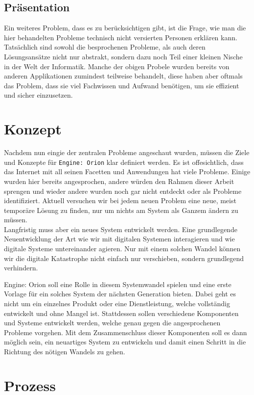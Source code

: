 \documentclass[11pt]{article}
\begin{document}
\subsection{Präsentation}
\label{sec:orga58f675}
Ein weiteres Problem, dass es zu berücksichtigen gibt, ist die Frage,
wie man die hier behandelten Probleme technisch nicht versierten
Personen erklären kann. Tatsächlich sind sowohl die besprochenen
Probleme, als auch deren Lösungsansätze nicht nur abstrakt, sondern
dazu noch Teil einer kleinen Nische in der Welt der Informatik.
Manche der obigen Probele wurden bereits von anderen Applikationen
zumindest teilweise behandelt, diese haben aber oftmals das Problem,
dass sie viel Fachwissen und Aufwand benötigen, um sie effizient und
sicher einzusetzen.
\section{Konzept}
\label{sec:org1cc2468}
Nachdem nun eingie der zentralen Probleme angeschaut wurden, müssen
die Ziele und Konzepte für \texttt{Engine: Orion} klar definiert werden. Es ist
offesichtlich, dass das Internet mit all seinen Facetten und
Anwendungen hat viele Probleme. Einige wurden hier bereits
angesprochen, andere würden den Rahmen dieser Arbeit sprengen und
wieder andere wurden noch gar nicht entdeckt oder als Probleme
identifiziert. Aktuell versuchen wir bei jedem neuen Problem eine
neue, meist temporäre Lösung zu finden, nur um nichts am System als
Ganzem ändern zu müssen.\\

\noindent Langfristig muss aber ein neues System entwickelt werden.
Eine grundlegende Neuentwicklung der Art wie wir mit digitalen
Systemen interagieren und wie digitale Systeme untereinander agieren.
Nur mit einem solchen Wandel können wir die digitale Katastrophe nicht
einfach nur verschieben, sondern grundlegend verhindern.

\noindent Engine: Orion soll eine Rolle in diesem Systemwandel spielen
und eine erste Vorlage für ein solches System der nächsten Generation
bieten. Dabei geht es nicht um ein einzelnes Produkt oder eine
Dienstleistung, welche vollständig entwickelt und ohne Mangel ist.
Stattdessen sollen verschiedene Komponenten und Systeme entwickelt
werden, welche genau gegen die angesprochenen Probleme vorgehen. Mit
dem Zusammenschluss dieser Komponenten soll es dann möglich sein, ein
neuartiges System zu entwickeln und damit einen Schritt in die
Richtung des nötigen Wandels zu gehen.
\section{Prozess}
\label{sec:orgca6ca7c}
\end{document}
